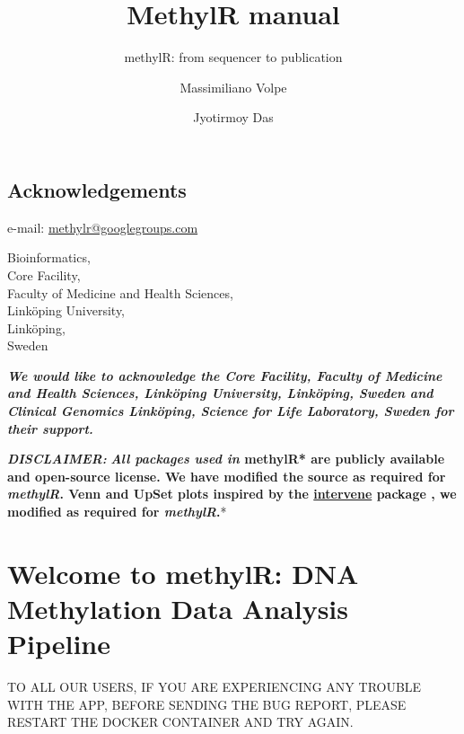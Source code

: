 \documentclass[
  a4paper,
  DIV=11,
  numbers=noendperiod,
  oneside,
  open=any]{scrreport}
\title{MethylR manual}
\subtitle{methylR: from sequencer to publication}
\author{Massimiliano Volpe \and Jyotirmoy Das}
\date{}
\renewcommand*\contentsname{Table of contents}
\newcommand\contentsname{Table of contents}
\begin{document}
\maketitle

\renewcommand*\contentsname{Contents}
{
\hypersetup{linkcolor=blue}
\setcounter{tocdepth}{1}
\tableofcontents
}
\listoffigures
{}

\chapter*{Acknowledgements}\label{acknowledgements}


e-mail: \url{methylr@googlegroups.com}

Bioinformatics,\\
Core Facility,\\
Faculty of Medicine and Health Sciences,\\
Linköping University,\\
Linköping,\\
Sweden

\textbf{\emph{We would like to acknowledge the Core Facility, Faculty of
Medicine and Health Sciences, Linköping University, Linköping, Sweden
and Clinical Genomics Linköping, Science for Life Laboratory, Sweden for
their support.}}

\textbf{\emph{DISCLAIMER: }} \textbf{\emph{All packages used in
}methylR* are publicly available and open-source license. We have
modified the source as required for \emph{methylR}. Venn and UpSet plots
inspired by the \href{https://github.com/asntech/intervene}{intervene}
package \autocite{khan2017intervene}, we modified as required for
\emph{methylR}.}*

\part{Welcome to methylR: DNA Methylation Data Analysis Pipeline}

\begin{tcolorbox}[enhanced jigsaw, opacityback=0, toprule=.15mm, bottomtitle=1mm, colback=white, rightrule=.15mm, breakable, coltitle=black, colbacktitle=quarto-callout-important-color!10!white, toptitle=1mm, arc=.35mm, colframe=quarto-callout-important-color-frame, bottomrule=.15mm, opacitybacktitle=0.6, titlerule=0mm, leftrule=.75mm, title=\textcolor{quarto-callout-important-color}{\faExclamation}\hspace{0.5em}{Important}, left=2mm]

TO ALL OUR USERS, IF YOU ARE EXPERIENCING ANY TROUBLE WITH THE APP,
BEFORE SENDING THE BUG REPORT, PLEASE RESTART THE DOCKER CONTAINER AND
TRY AGAIN.

\end{tcolorbox}
\end{document}
